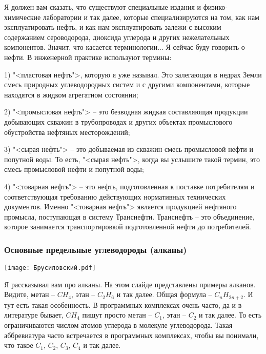 \documentclass[main.tex]{subfiles}
\begin{document}
Я должен вам сказать, что существуют специальные издания и физико-химические лаборатории и так далее, которые специализируются на том, как нам эксплуатировать нефть, и как нам эксплуатировать залежи с высоким содержанием сероводорода, диоксида углерода и других нежелательных компонентов.
Значит, что касается терминологии...
Я сейчас буду говорить о нефти.
В инженерной практике используют термины:

1) "<пластовая нефть">, которую я уже называл.
Это залегающая в недрах Земли смесь природных углеводородных систем и с другими компонентами, которые находятся в жидком агрегатном состоянии;

2) "<промысловая нефть"> -- это безводная жидкая составляющая продукции добывающих скважин в трубопроводах и других объектах промыслового обустройства нефтяных месторождений;

3) "<сырая нефть"> -- это добываемая из скважин смесь промысловой нефти и попутной воды.
То есть, "<сырая нефть">, когда вы услышите такой термин, это смесь промысловой нефти и попутной воды;

4) "<товарная нефть"> -- это нефть, подготовленная к поставке потребителям и соответствующая требованию действующих нормативных технических документов.
Именно "<товарная нефть"> является продукцией нефтяного промысла, поступающая в систему Транснефти.
Транснефть -- это объединение, которое занимается транспортировкой подготовленной нефти до потребителей.

\subsubsection{Основные предельные углеводороды (алканы)}

\begin{center}
\texttt{[image: Брусиловский.pdf]}
\end{center}

Я рассказывал вам про алканы.
На этом слайде представлены примеры алканов.
Видите, метан -- $CH_4$, этан -- $C_2H_6$ и так далее.
Общая формула -- $C_nH_{2n+2}$.
И тут есть такая особенность.
В программных комплексах очень часто, да и в литературе бывает, $CH_4$ пишут просто метан -- $C_1$, этан -- $C_2$ и так далее.
То есть ограничиваются числом атомов углерода в молекуле углеводорода.
Такая аббревиатура часто встречается в программных комплексах, чтобы вы понимали, что такое $C_1$, $C_2$, $C_3$, $C_4$ и так далее.
\end{document}

